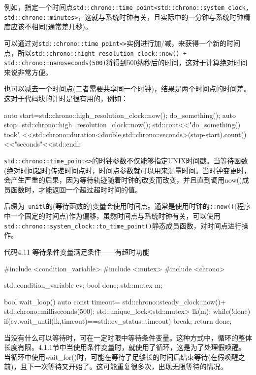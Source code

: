 例如，指定一个时间点\texttt{std::chrono::time\_point<std::chrono::system\_clock, std::chrono::minutes>}，这就与系统时钟有关，且实际中的一分钟与系统时钟精度应该不相同(通常差几秒)。

可以通过对\texttt{std::chrono::time\_point<>}实例进行加/减，来获得一个新的时间点，所以\texttt{std::chrono::hight\_resolution\_clock::now() + std::chrono::nanoseconds(500)}将得到500纳秒后的时间，这对于计算绝对时间来说非常方便。

也可以减去一个时间点(二者需要共享同一个时钟)，结果是两个时间点的时间差。这对于代码块的计时是很有用的，例如：

\begin{cpp}
auto start=std::chrono::high_resolution_clock::now();
do_something();
auto stop=std::chrono::high_resolution_clock::now();
std::cout<<"do_something() took"
  <<std::chrono::duration<double,std::chrono::seconds>(stop-start).count()
  <<"seconds"<<std::endl;
\end{cpp}

\texttt{std::chrono::time\_point<>}的时钟参数不仅能够指定UNIX时间戳。当等待函数(绝对时间超时)传递时间点时，时间点参数就可以用来测量时间。当时钟变更时，会产生严重的后果，因为等待轨迹随着时钟的改变而改变，并且直到调用now()成员函数时，才能返回一个超过超时时间的值。

后缀为\texttt{\_unitl}的(等待函数的)变量会使用时间点。通常是使用时钟的\texttt{::now()}(程序中一个固定的时间点)作为偏移，虽然时间点与系统时钟有关，可以使用\texttt{std::chrono::system\_clock::to\_time\_point()}静态成员函数，对时间点进行操作。

代码4.11 等待条件变量满足条件——有超时功能

\begin{cpp}
#include <condition_variable>
#include <mutex>
#include <chrono>

std::condition_variable cv;
bool done;
std::mutex m;

bool wait_loop()
{
  auto const timeout= std::chrono::steady_clock::now()+
      std::chrono::milliseconds(500);
  std::unique_lock<std::mutex> lk(m);
  while(!done)
  {
    if(cv.wait_until(lk,timeout)==std::cv_status::timeout)
      break;
  }
  return done;
}
\end{cpp}

当没有什么可以等待时，可在一定时限中等待条件变量。这种方式中，循环的整体长度有限。4.1.1节中当使用条件变量时，就使用了循环，这是为了处理假唤醒。当循环中使用wait\_for()时，可能在等待了足够长的时间后结束等待(在假唤醒之前)，且下一次等待又开始了。这可能重复很多次，出现无限等待的情况。

